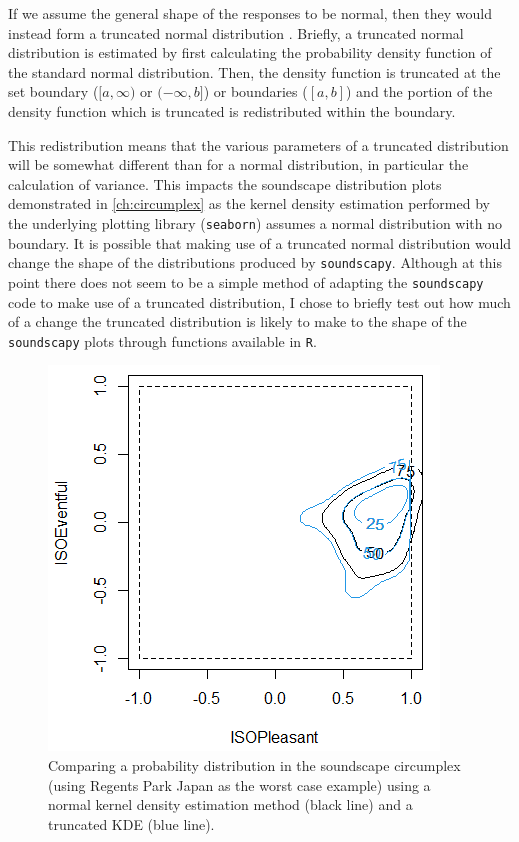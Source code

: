 If we assume the general shape of the responses to be normal, then they would instead form a truncated normal distribution . Briefly, a truncated normal distribution is estimated by first calculating the probability density function of the standard normal distribution. Then, the density function is truncated at the set boundary ($[a, \infty)$ or $(-\infty, b]$) or boundaries ($[a, b]$) and the portion of the density function which is truncated is redistributed within the boundary.

This redistribution means that the various parameters of a truncated distribution will be somewhat different than for a normal distribution, in particular the calculation of variance. This impacts the soundscape distribution plots demonstrated in \cref{ch:circumplex} as the kernel density estimation performed by the underlying plotting library (\texttt{seaborn}) assumes a normal distribution with no boundary. It is possible that making use of a truncated normal distribution would change the shape of the distributions produced by \texttt{soundscapy}. Although at this point there does not seem to be a simple method of adapting the \texttt{soundscapy} code to make use of a truncated distribution, I chose to briefly test out how much of a change the truncated distribution is likely to make to the shape of the \texttt{soundscapy} plots through functions available in \texttt{R}.

\begin{figure}
  \centering
  \includegraphics{Figures/Trunc-Normal-demo.png}
  \caption{Comparing a probability distribution in the soundscape circumplex (using Regents Park Japan as the worst case example) using a normal kernel density estimation method (black line) and a truncated KDE (blue line). \label{fig:truncatekde}}
\end{figure}


